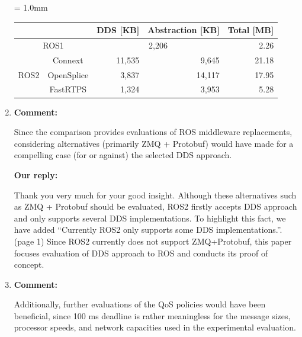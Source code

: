 \documentclass{article}
\begin{document}
\begin{enumerate}
\begin{table}[H]
    \renewcommand{\arraystretch}{1.15}
    \label{tb:memory}
    \small
    \tabcolsep = 1.0mm              %
    \begin{tabular}{c|c||r|r||r}
      \hline
      \multicolumn{2}{c||}{} & DDS [KB] & Abstraction [KB] & Total [MB] \\ \hline \hline
      \multicolumn{2}{c||}{ROS1}  & \multicolumn{2}{c||}{ 2,206 } & 2.26 \\ \hline
      \multirow{3}{*}{ROS2} & Connext & 11,535 & 9,645 & 21.18 \\ 
      & OpenSplice & 3,837 & 14,117 & 17.95 \\ 
      & FastRTPS & 1,324 & 3,953 & 5.28\\ \hline
    \end{tabular}
  \end{table}

\item \begin{flushleft}
    \textbf{Comment:}
  \end{flushleft}
  Since the comparison provides evaluations of ROS middleware replacements, considering alternatives (primarily ZMQ + Protobuf) would have made for a compelling case (for or against) the selected DDS approach.

  \begin{flushleft}
    \textbf{Our reply:}
  \end{flushleft}
  Thank you very much for your good insight. 
  Although these alternatives such as ZMQ + Protobuf should be evaluated, ROS2 firstly accepts DDS approach and only supports several DDS implementations.
  To highlight this fact, we have added ``Currently ROS2 only supports some DDS implementations.''. (page 1)
  Since ROS2 currently does not support ZMQ+Protobuf, this paper focuses evaluation of DDS approach to ROS and conducts its proof of concept.
  
\item \begin{flushleft}
    \textbf{Comment:}
  \end{flushleft}
  Additionally, further evaluations of the QoS policies would have been beneficial, since 100 ms deadline is rather meaningless for the message sizes, processor speeds, and network capacities used in the experimental evaluation.


\end{enumerate}
\end{document}
